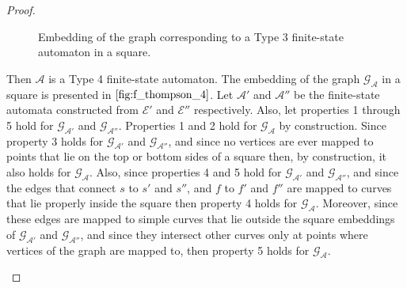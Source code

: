 \begin{proof}
\begin{case}[$\mathcal{E} = \mathcal{E}'.\mathcal{E}''$ where $\mathcal{E}'$ and
    $\mathcal{E}''$ are regular expressions]
    \begin{figure}[!h]
      \centering
      \caption{Embedding of the graph corresponding to a Type 3 finite-state
      automaton in a square.}
      \label{fig:f_thompson_3}
    \end{figure}
  \end{case}

  \begin{case}[$\mathcal{E} = \mathcal{E}'+\mathcal{E}''$ where $\mathcal{E}'$ and
    $\mathcal{E}''$ are regular expressions]
    Then $\mathcal{A}$ is a Type 4 finite-state automaton. The embedding of the
    graph $\mathcal{G}_{\mathcal{A}}$ in a square is presented in
    $\Cref{fig:f_thompson_4}$. Let $\mathcal{A}'$ and $\mathcal{A}''$ be the
    finite-state automata constructed from $\mathcal{E}'$ and $\mathcal{E}''$
    respectively. Also, let properties 1 through 5 hold for
    $\mathcal{G}_\mathcal{A'}$ and $\mathcal{G}_\mathcal{A''}$. Properties 1 and 2
    hold for $\mathcal{G}_{\mathcal{A}}$ by construction. Since property 3 holds
    for $\mathcal{G}_\mathcal{A'}$ and $\mathcal{G}_\mathcal{A''}$, and
    since no vertices are ever mapped to points that lie on the top or
    bottom sides of a square then, by construction, it also holds for
    $\mathcal{G}_\mathcal{A}$. Also, since properties 4 and 5 hold for
    $\mathcal{G}_\mathcal{A'}$ and $\mathcal{G}_\mathcal{A''}$, and since the edges
    that connect $s$ to $s'$ and $s''$, and $f$ to $f'$ and $f''$ are mapped to
    curves that lie properly inside the square then property 4 holds for
    $\mathcal{G}_\mathcal{A}$. Moreover, since these edges are mapped to simple
    curves that lie outside the square embeddings of $\mathcal{G}_\mathcal{A'}$ and
    $\mathcal{G}_\mathcal{A''}$, and since they intersect other curves only at points
    where vertices of the graph are mapped to, then property 5 holds for
    $\mathcal{G}_\mathcal{A}$.


\end{case}
\end{proof}
